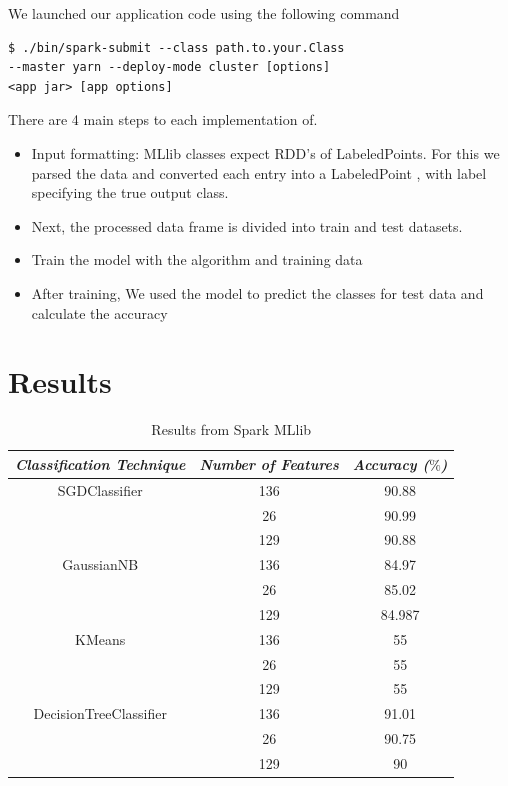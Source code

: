 \documentclass[9pt,twocolumn,twoside]{../../styles/osajnl}
\begin{document}
We launched our application code using the following command
\begin{verbatim}
$ ./bin/spark-submit --class path.to.your.Class 
--master yarn --deploy-mode cluster [options] 
<app jar> [app options]
\end{verbatim}

 There are 4 main steps to each implementation of.
 \begin{itemize}
  \item Input formatting: MLlib classes expect RDD’s of LabeledPoints. For this we parsed the data and converted each entry into a LabeledPoint , with label specifying the true output class.
\item Next, the processed data frame is divided into train and test datasets.
\item Train the model with the algorithm and training data
\item After  training, We used the model to predict the classes for test data and calculate the accuracy
 \end{itemize}

\section{Results}

\begin{table}[h!]
\centering
 \begin{tabular}{|c c c|} 
 \hline
 \textit{Classification Technique} & \textit{Number of Features} & \textit{Accuracy ($\%$)}\\ 
 \hline
 \hline 
  SGDClassifier & 136 & 90.88
 \\  & 26 & 90.99\\
  & 129 & 90.88\\
 \hline 
  GaussianNB & 136 & 84.97
 \\  & 26 & 85.02\\
  & 129 & 84.987
\\ 
 \hline 
   KMeans & 136 & 55
 \\ 
   & 26 & 55\\
  & 129 & 55\\ 
 \hline 
DecisionTreeClassifier & 136 & 91.01 \\ & 26 & 90.75\\
  & 129 & 90\\
\hline 
\end{tabular}
\caption{Results from Spark MLlib}
\label{table:mllib}
\end{table}
\end{document}
